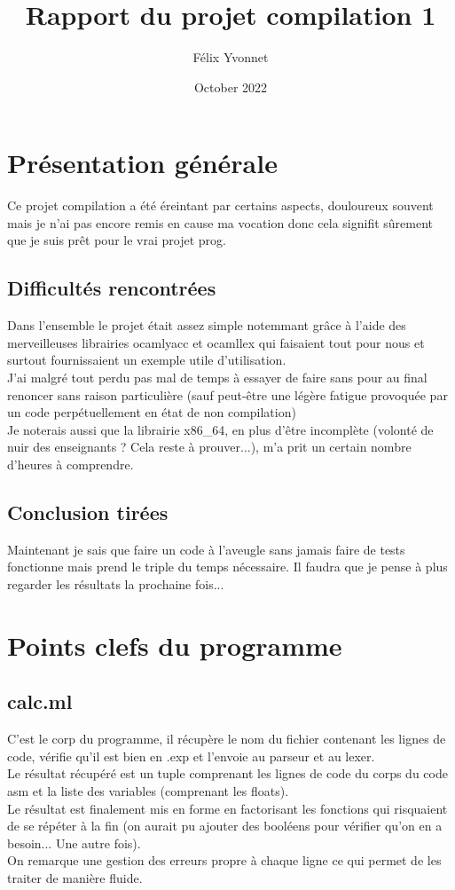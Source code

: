 \documentclass{article}
\title{Rapport du projet compilation 1}
\author{Félix Yvonnet}
\date{October 2022}
\begin{document}
\maketitle

\section{Présentation générale}
Ce projet compilation a été éreintant par certains aspects, douloureux souvent mais je n'ai pas encore remis en cause ma vocation donc cela signifit sûrement que je suis prêt pour le vrai projet prog.

\subsection{Difficultés rencontrées}
Dans l'ensemble le projet était assez simple notemmant grâce à l'aide des merveilleuses librairies ocamlyacc et ocamllex qui faisaient tout pour nous et surtout fournissaient un exemple utile d'utilisation.\\
J'ai malgré tout perdu pas mal de temps à essayer de faire sans pour au final renoncer sans raison particulière (sauf peut-être une légère fatigue provoquée par un code perpétuellement en état de non compilation)\\
Je noterais aussi que la librairie x86\_64, en plus d'être incomplète (volonté de nuir des enseignants ? Cela reste à prouver$\dots$), m'a prit un certain nombre d'heures à comprendre.\\

\subsection{Conclusion tirées}
Maintenant je sais que faire un code à l'aveugle sans jamais faire de tests fonctionne mais prend le triple du temps nécessaire. Il faudra que je pense à plus regarder les résultats la prochaine fois...\\




\newpage
\section{Points clefs du programme}
\subsection{calc.ml}
C'est le corp du programme, il récupère le nom du fichier contenant les lignes de code, vérifie qu'il est bien en .exp et l'envoie au parseur et au lexer. \\
Le résultat récupéré est un tuple comprenant les lignes de code du corps du code asm et la liste des variables (comprenant les floats).\\
Le résultat est finalement mis en forme en factorisant les fonctions qui risquaient de se répéter à la fin (on aurait pu ajouter des booléens pour vérifier qu'on en a besoin... Une autre fois).\\
On remarque une gestion des erreurs propre à chaque ligne ce qui permet de les traiter de manière fluide.\\
\end{document}

